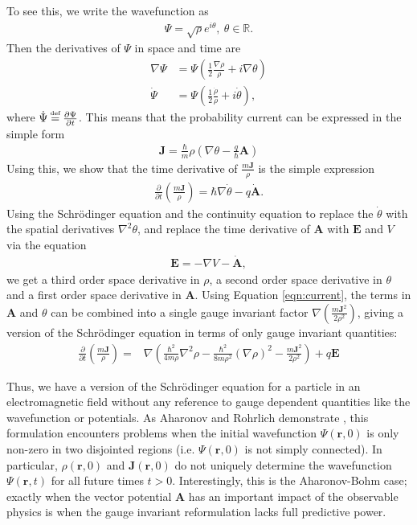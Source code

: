 To see this, we write the wavefunction as
\begin{align}
    \Psi = \sqrt{\rho} e^{i \theta}, ~ \theta \in \mathbb{R}.
\end{align}
Then the derivatives of $\Psi$ in space and time are
\begin{align}
    \nabla \Psi &= \Psi \left( \frac{1}{2} \frac{\nabla
        \rho}{\rho} + i \nabla \theta \right) \\
    \dot \Psi &= \Psi \left( \frac{1}{2} \frac{\dot
        \rho}{\rho} + i \dot \theta \right),
\end{align}
where $\dot \Psi \defeq \dbydt{\Psi}$. This means that the probability current
can be expressed in the simple form
\begin{align}
    \mathbf{J} = \frac{\hbar}{m} \rho \left( \nabla \theta - \frac{q}{\hbar}
        \mathbf{A} \right)
    \label{eqn:current}
\end{align}
Using this, we show that the time derivative of $\frac{m \mathbf{J}}{\rho}$ is
the simple expression
\begin{align}
    \frac{\partial}{\partial t}\left(\frac{m \mathbf{J}}{\rho}\right)
        = \hbar \nabla \dot \theta - q\mathbf{\dot A}.
\end{align}
Using the Schr\"odinger equation and the continuity equation to replace the
$\dot \theta$ with the spatial derivatives $\nabla^2 \theta$, and replace the
time derivative of $\mathbf{A}$ with $\mathbf{E}$ and $V$ via the equation
\begin{align}
    \mathbf{E} = - \nabla V - \mathbf{\dot A},
\end{align}
we get a third order space derivative in $\rho$, a second order space derivative
in $\theta$ and a first order space derivative in $\mathbf{A}$. Using Equation
\ref{eqn:current}, the terms in $\mathbf{A}$ and $\theta$ can be combined into a
single gauge invariant factor $\nabla \left( \frac{m \mathbf{J}^2}{2 \rho^2}
\right)$, giving a version of the Schr\"odinger equation in terms of only gauge
invariant quantities:
\begin{align}
    \frac{\partial}{\partial t} \left( \frac{m \mathbf{J}}{\rho} \right)
    =& \nabla \left( \frac{\hbar^2}{4m\rho} \nabla^2 \rho -
       \frac{\hbar^2}{8m\rho^2} \left(\nabla \rho \right)^2 - \frac{m
       \mathbf{J}^2}{2 \rho^2} \right) + q\mathbf{E}
    \label{eqn:gise}
\end{align}

Thus, we have a version of the Schr\"odinger equation for a particle in an
electromagnetic field without any reference to gauge dependent quantities like
the wavefunction or potentials. As Aharonov and Rohrlich demonstrate
\cite{aharonov-rohrlich}, this formulation encounters problems when the initial
wavefunction $\Psi(\mathbf{r}, 0)$ is only non-zero in two disjointed regions
(i.e. $\Psi(\mathbf{r}, 0)$ is not simply connected). In particular,
$\rho(\mathbf{r}, 0)$ and $\mathbf{J}(\mathbf{r}, 0)$ do not uniquely determine
the wavefunction $\Psi(\mathbf{r}, t)$ for all future times $t > 0$.
Interestingly, this is the Aharonov-Bohm case; exactly when the vector potential
$\mathbf{A}$ has an important impact of the observable physics is when the gauge
invariant reformulation lacks full predictive power.

